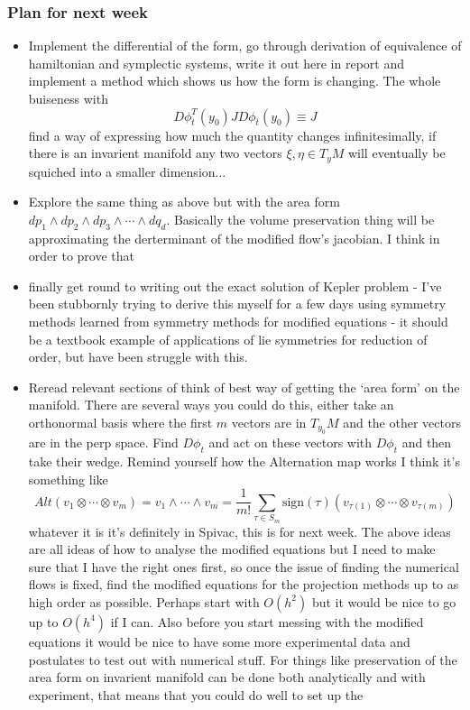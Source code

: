 \documentclass[12pt]{article}
\begin{document}
\subsubsection{Plan for next week}
\begin{itemize}
    \item Implement the differential of the form, go through derivation of equivalence of hamiltonian and symplectic systems, write it out here in report and implement a method which shows us how the form is changing. The whole buiseness with 
    $$
    D\phi_t^T(y_0) J D\phi_t(y_0) \equiv J
    $$
    find a way of expressing how much the quantity changes infinitesimally, if there is an invarient manifold any two vectors $\xi,\eta \in T_y M$ will eventually be squiched into a smaller dimension...
    \item Explore the same thing as above but with the area form $dp_1\wedge dp_2\wedge dp_3\wedge \cdots \wedge dq_d$. Basically the volume preservation thing will be approximating the derterminant of the modified flow's jacobian. I think in order to prove that 
    
    \item finally get round to writing out the exact solution of Kepler problem - I've been stubbornly trying to derive this myself for a few days using symmetry methods learned from symmetry methods for modified equations - it should be a textbook example of applications of lie symmetries for reduction of order, but have been struggle with this. 
    
    \item Reread relevant sections of \cite{Spivak} think of best way of getting the `area form' on the manifold. There are several ways you could do this, either take an orthonormal basis where the first $m$ vectors are in $T_{y_0} M$ and the other vectors are in the perp space. Find $D\phi_t$ and act on these vectors with $D\phi_t$ and then take their wedge. Remind yourself how the Alternation map works I think it's something like 
    $$
    Alt(v_1\otimes \cdots\otimes v_m) = v_1\wedge \cdots \wedge v_m = \frac{1}{m!}\sum_{\tau\in S_m} \text{sign}(\tau) (v_{\tau(1)} \otimes\cdots\otimes v_{\tau(m)})
    $$
    whatever it is it's definitely in Spivac, this is for next week. The above ideas are all ideas of how to analyse the modified equations but I need to make sure that I have the right ones first, so once the issue of finding the numerical flows is fixed, find the modified equations for the projection methods up to as high order as possible. Perhaps start with $O(h^2)$ but it would be nice to go up to $O(h^4)$ if I can. Also before you start messing with the modified equations it would be nice to have some more experimental data and postulates to test out with numerical stuff. For things like preservation of the area form on invarient manifold can be done both analytically and with experiment, that means that you could do well to set up the 
    

\end{itemize}
\end{document}
